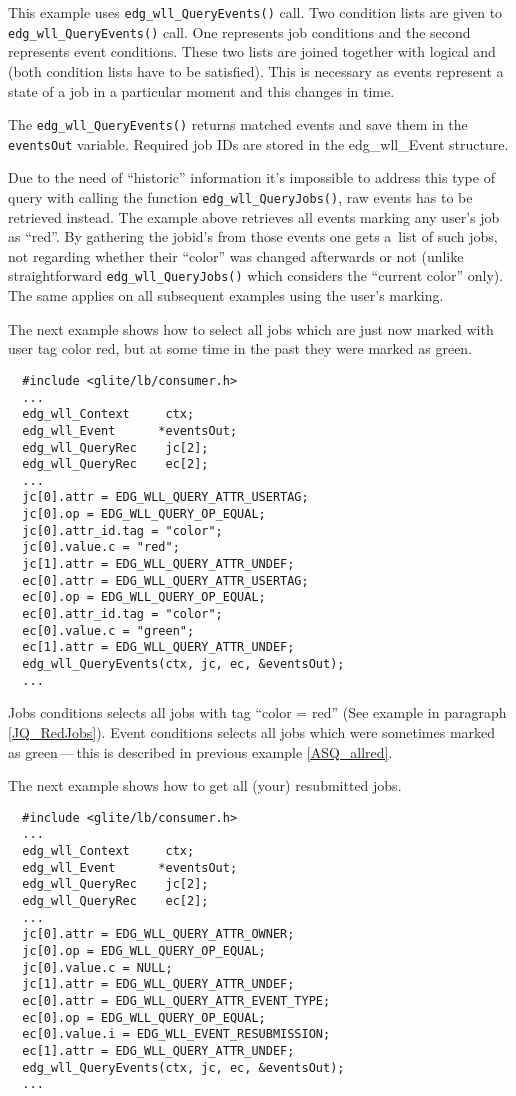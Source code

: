 This example uses \texttt{edg\_wll\_QueryEvents()} call. Two condition lists are
given to \texttt{edg\_wll\_QueryEvents()} call. One represents job conditions and
the second represents event conditions. These two lists are joined together with
logical and (both condition lists have to be satisfied). This is necessary as
events represent a state of a job in a particular moment and this changes in time.

The \texttt{edg\_wll\_QueryEvents()} returns matched events and save them in the
\texttt{eventsOut} variable. Required job IDs are stored in the edg\_wll\_Event
structure. 

Due to the need of ``historic'' information it's impossible to address
this type of query with calling the function \texttt{edg\_wll\_QueryJobs()}, raw events has to
be retrieved instead. The example above retrieves all events marking
any user's job as ``red''. By gathering the jobid's from those events one
gets a~list of such jobs, not regarding whether their ``color'' was
changed afterwards or not (unlike straightforward \texttt{edg\_wll\_QueryJobs()}
which considers the ``current color'' only). The same applies on all
subsequent examples using the user's marking.

The next example shows how to select all jobs which are just now marked with
user tag color red, but at some time in the past they were marked as green.
\begin{verbatim}
  #include <glite/lb/consumer.h>
  ...
  edg_wll_Context     ctx;    
  edg_wll_Event      *eventsOut;
  edg_wll_QueryRec    jc[2];
  edg_wll_QueryRec    ec[2];
  ...
  jc[0].attr = EDG_WLL_QUERY_ATTR_USERTAG;
  jc[0].op = EDG_WLL_QUERY_OP_EQUAL;
  jc[0].attr_id.tag = "color";
  jc[0].value.c = "red";
  jc[1].attr = EDG_WLL_QUERY_ATTR_UNDEF;
  ec[0].attr = EDG_WLL_QUERY_ATTR_USERTAG;
  ec[0].op = EDG_WLL_QUERY_OP_EQUAL;
  ec[0].attr_id.tag = "color";
  ec[0].value.c = "green";
  ec[1].attr = EDG_WLL_QUERY_ATTR_UNDEF;
  edg_wll_QueryEvents(ctx, jc, ec, &eventsOut);
  ...
\end{verbatim}

Jobs conditions selects all jobs with tag ``color = red'' (See example in paragraph
\ref{JQ_RedJobs}). Event conditions selects all jobs which were sometimes marked
as green\,---\,this is described in previous example \ref{ASQ_allred}.

The next example shows how to get all (your) resubmitted jobs.
\begin{verbatim}
  #include <glite/lb/consumer.h>
  ...
  edg_wll_Context     ctx;    
  edg_wll_Event      *eventsOut;
  edg_wll_QueryRec    jc[2];
  edg_wll_QueryRec    ec[2];
  ...
  jc[0].attr = EDG_WLL_QUERY_ATTR_OWNER;
  jc[0].op = EDG_WLL_QUERY_OP_EQUAL;
  jc[0].value.c = NULL;
  jc[1].attr = EDG_WLL_QUERY_ATTR_UNDEF;
  ec[0].attr = EDG_WLL_QUERY_ATTR_EVENT_TYPE;
  ec[0].op = EDG_WLL_QUERY_OP_EQUAL;
  ec[0].value.i = EDG_WLL_EVENT_RESUBMISSION;
  ec[1].attr = EDG_WLL_QUERY_ATTR_UNDEF;
  edg_wll_QueryEvents(ctx, jc, ec, &eventsOut);
  ...
\end{verbatim}


